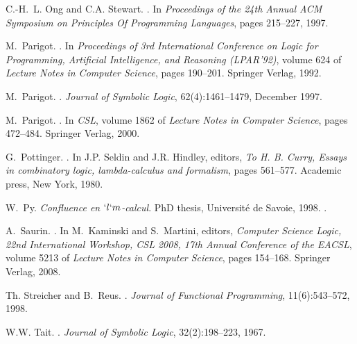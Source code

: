 \documentclass{lmcs}
\begin{document}
\begin{thebibliography}{10}
C.-H.~L. Ong and C.A. Stewart.
.
\newblock In \emph{Proceedings of the 24th Annual {ACM} Symposium on Principles
 Of Programming Languages}, pages 215--227, 1997.

M.~Parigot.
.
\newblock In \emph{Proceedings of 3rd International Conference on Logic for
 Programming, Artificial Intelligence, and Reasoning (LPAR'92)}, volume 624 of
 \emph{Lecture Notes in Computer Science}, pages 190--201. Springer Verlag,
 1992.

M.~Parigot.
.
\newblock \emph{Journal of Symbolic Logic}, 62(4):1461--1479, December 1997.

M.~Parigot.
.
\newblock In \emph{CSL}, volume 1862 of \emph{Lecture Notes in Computer Science},
 pages 472--484. Springer Verlag, 2000.

G.~Pottinger.
.
\newblock In J.P. Seldin and J.R. Hindley, editors, \emph{To H. B. Curry, Essays
 in combinatory logic, lambda-calculus and formalism}, pages 561--577.
 Academic press, New York, 1980.

W.~Py.
\newblock \emph{{Confluence en $`l`m$-calcul}}.
\newblock PhD thesis, {Universit\'e de Savoie}, 1998.
.

A.~Saurin.
.
\newblock In M.~Kaminski and S.~Martini, editors, \emph{{Computer Science Logic,
 22nd International Workshop, CSL 2008, 17th Annual Conference of the EACSL}},
 volume 5213 of \emph{Lecture Notes in Computer Science}, pages 154--168.
 Springer Verlag, 2008.

Th. Streicher and B.~Reus.
.
\newblock \emph{Journal of Functional Programming}, 11(6):543--572, 1998.

W.W. Tait.
.
\newblock \emph{Journal of Symbolic Logic}, 32(2):198--223, 1967.

 \end{thebibliography}

 
\end{document}

